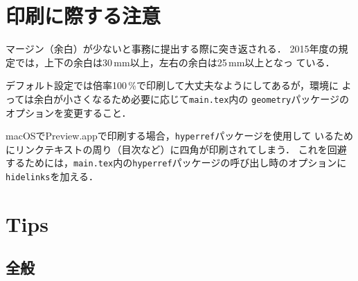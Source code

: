 \section{印刷に際する注意}

マージン（余白）が少ないと事務に提出する際に突き返される．
2015年度の規定では，上下の余白は30\,mm以上，左右の余白は25\,mm以上となっ
ている．

デフォルト設定では倍率100\,\%で印刷して大丈夫なようにしてあるが，環境に
よっては余白が小さくなるため必要に応じて\texttt{main.tex}内の
\texttt{geometry}パッケージのオプションを変更すること．

macOSでPreview.appで印刷する場合，\texttt{hyperref}パッケージを使用して
いるためにリンクテキストの周り（目次など）に四角が印刷されてしまう．
これを回避するためには，\texttt{main.tex}内の\texttt{hyperref}パッケージの呼び出し時のオプションに\texttt{hidelinks}を加える．

\section{Tips}

\subsection{全般}

